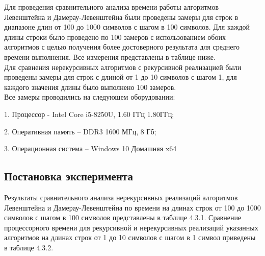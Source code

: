 \documentclass{article}
\begin{document}
Для проведения сравнительного анализа времени работы алгоритмов Левенштейна и Дамерау-Левенштейна были проведены замеры для строк в диапазоне длин от 100 до 1000 символов с шагом в 100 символов. Для каждой длины строки было проведено по 100 замеров с использованием обоих алгоритмов с целью получения более достоверного результата для среднего времени выполнения. Все измерения представлены в таблице ниже.\\

Для сравнения нерекурсивных алгоритмов с рекурсивной реализацией были проведены замеры для строк с длиной от 1 до 10 символов с шагом 1, для каждого значения длины было выполнено 100 замеров.\\

Все замеры проводились на следующем оборудовании:

1. Процессор - Intel Core i5-8250U, 1.60 ГГц 1.80ГГц;

2. Оперативная память – DDR3 1600 МГц, 8 Гб;

3. Операционная система – Windows 10 Домашняя x64

\subsection{Постановка эксперимента}
\label{sec:experiment:an}

Результаты сравнительного анализа нерекурсивных реализаций алгоритмов Левенштейна и Дамерау-Левенштейна по времени на длинах строк от 100 до 1000 символов с шагом в 100 символов представлены в  таблице 4.3.1.
Сравнение процессорного времени для рекурсивной и нерекурсивных реализаций указанных алгоритмов на длинах строк от 1 до 10 символов с шагом в 1 символ приведены в таблице 4.3.2.\\
\end{document}
